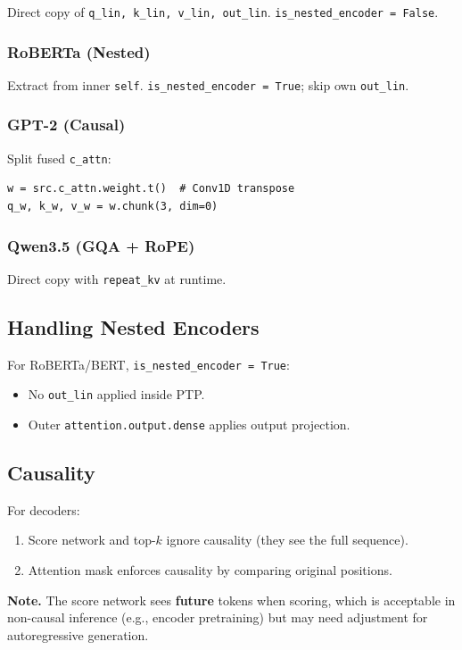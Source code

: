 {Direct copy of \texttt{q\_lin, k\_lin, v\_lin, out\_lin}. \texttt{is\_nested\_encoder = False}.

\subsubsection{RoBERTa (Nested)}

Extract from inner \texttt{self}. \texttt{is\_nested\_encoder = True}; skip own \texttt{out\_lin}.

\subsubsection{GPT-2 (Causal)}

Split fused \texttt{c\_attn}:

\begin{lstlisting}
w = src.c_attn.weight.t()  # Conv1D transpose
q_w, k_w, v_w = w.chunk(3, dim=0)
\end{lstlisting}

\subsubsection{Qwen3.5 (GQA + RoPE)}

Direct copy with \texttt{repeat\_kv} at runtime.

\subsection{Handling Nested Encoders}

For RoBERTa/BERT, \texttt{is\_nested\_encoder = True}:
\begin{itemize}
\item No \texttt{out\_lin} applied inside PTP.
\item Outer \texttt{attention.output.dense} applies output projection.

\end{itemize}
\subsection{Causality}

For decoders:
\begin{enumerate}
\item Score network and top-$k$ ignore causality (they see the full sequence).
\item Attention mask enforces causality by comparing original positions.

\end{enumerate}
\textbf{Note.} The score network sees \textbf{future} tokens when scoring, which is 
acceptable in non-causal inference (e.g., encoder pretraining) but may 
need adjustment for autoregressive generation.

}
